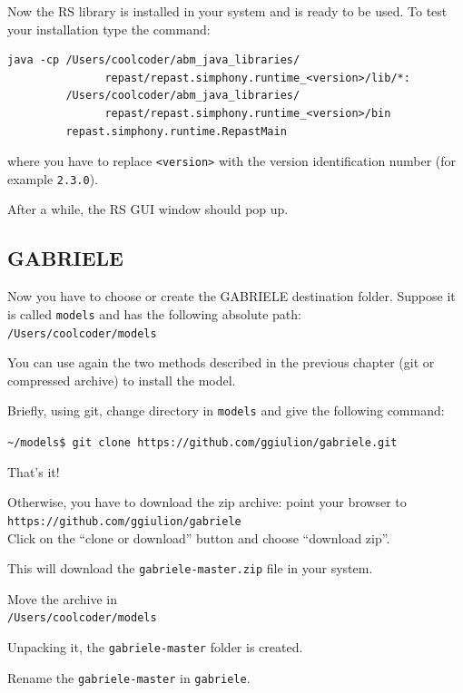 \documentclass{book}
\begin{document}
Now the RS library is installed in your system and is ready to be used.
To test your installation type the command:\\
\begin{verbatim}
java -cp /Users/coolcoder/abm_java_libraries/
               repast/repast.simphony.runtime_<version>/lib/*:
         /Users/coolcoder/abm_java_libraries/
               repast/repast.simphony.runtime_<version>/bin 
         repast.simphony.runtime.RepastMain
\end{verbatim}
where you have to replace \verb+<version>+ with the version identification number (for example \verb+2.3.0+).

After a while, the RS GUI window should pop up.




\subsection{GABRIELE}

Now you have to choose or create the GABRIELE destination folder.
Suppose it is called \verb+models+ and has the following absolute path: \\
\verb+/Users/coolcoder/models+

You can use again the two methods described in the previous chapter (git or compressed archive) to install the model. 

Briefly, using git, change directory in \verb+models+ and give the following command:

\vskip2mm
\noindent\verb+~/models$ +\color{red}\verb+git clone https://github.com/ggiulion/gabriele.git+ \color{black}

\vskip2mm
That's it!

Otherwise, you have to download the zip archive: point your browser to\\ 
\verb+https://github.com/ggiulion/gabriele+\\
Click on the ``clone or download'' button and choose ``download zip''.

This will download the \verb+gabriele-master.zip+ file in your system.

Move the archive in\\
\verb+/Users/coolcoder/models+

Unpacking it, the \verb+gabriele-master+ folder is created.

Rename the \verb+gabriele-master+ in \verb+gabriele+.
\end{document}
